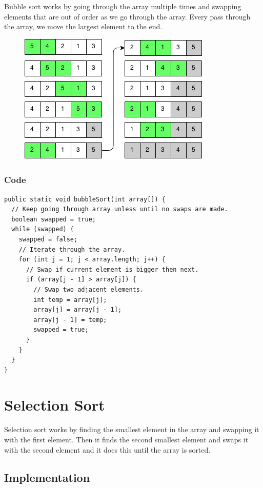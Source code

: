 \documentclass[11pt,oneside]{book}
\makeatletter
\def\maxwidth#1{\ifdim\Gin@nat@width>#1 #1\else\Gin@nat@width\fi}
\makeatother
\begin{document}
Bubble sort works by going through the array multiple times and swapping elements that are out of order as we go through the array. Every pass through the array, we move the largest element to the end.

\vspace{5px}\begin{figure}[H]\centering
        \includegraphics[width=0.66\maxwidth{\textwidth}]{bubble_sort.png}
        \end{figure}

\subsubsection{Code}

\begin{lstlisting}
public static void bubbleSort(int array[]) {
  // Keep going through array unless until no swaps are made.
  boolean swapped = true;
  while (swapped) {
    swapped = false;
    // Iterate through the array.
    for (int j = 1; j < array.length; j++) {
      // Swap if current element is bigger then next.
      if (array[j - 1] > array[j]) {
        // Swap two adjacent elements.
        int temp = array[j];
        array[j] = array[j - 1];
        array[j - 1] = temp;
        swapped = true;
      }
    }
  }
}
\end{lstlisting}

        \section{ Selection Sort }
        

Selection sort works by finding the smallest element in the array and swapping it with the first element. Then it finds the second smallest element and swaps it with the second element and it does this until the array is sorted.

\subsection{Implementation}
\end{document}
